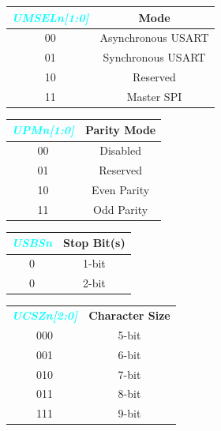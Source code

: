 \documentclass{article}
\newcommand{\bitFormat}[1]{\emph{\textbf{\textcolor{cyan}{#1}}}}
\begin{document}
\begin{table}[H]    
\begin{minipage}{0.4\linewidth}
    \begin{tabular}{c|c}
        \bitFormat{UMSELn[1:0]} & \textbf{Mode}\\
        \hline
        00 & Asynchronous USART\\
        01 & Synchronous USART\\
        10 & Reserved\\
        11 & Master SPI\\
    \end{tabular}
\end{minipage}
\begin{minipage}{0.3\linewidth}
    \begin{tabular}{c|c}
        \bitFormat{UPMn[1:0]} & \textbf{Parity Mode}\\
        \hline
        00 & Disabled\\
        01 & Reserved\\
        10 & Even Parity\\
        11 & Odd Parity\\
    \end{tabular}
\end{minipage}
\begin{minipage}{0.29\linewidth}
    \begin{tabular}{c|c}
        \bitFormat{USBSn} & \textbf{Stop Bit(s)}\\
        \hline
        0 & 1-bit\\
        0 & 2-bit\\
    \end{tabular}
\end{minipage}
\end{table}

\begin{table}[H]
    \begin{center}
        \begin{tabular}{c|c}
            \bitFormat{UCSZn[2:0]} & \textbf{Character Size}\\
            000 & 5-bit\\
            001 & 6-bit\\
            010 & 7-bit\\
            011 & 8-bit\\
            111 & 9-bit\\
        \end{tabular}
    \end{center}
\end{table}
\end{document}
